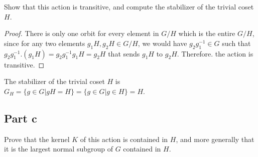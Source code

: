 \begin{question}
    Show that this action is transitive, and compute the stabilizer of the trivial coset $H$.
\end{question}

\begin{answer}
    \begin{proof}
        There is only one orbit for every element in $G/H$ which is the entire $G/H$, since for any two elements $g_1H, g_2H \in G/H$, we would have $g_2g_1^{-1} \in G$ such that $g_2g_1^{-1}.(g_1H) = g_2g_1^{-1}g_1H = g_2H$ that sends $g_1H$ to $g_2H$. Therefore. the action is transitive.
    \end{proof}
    The stabilizer of the trivial coset $H$ is $G_H = \{g \in G \lvert gH = H\} = \{g \in G \lvert g \in H\} = H$.
\end{answer}

\subsection{Part c}

\begin{question}
    Prove that the kernel $K$ of this action is contained in $H$, and more generally that it is the largest normal subgroup of $G$ contained in $H$.
\end{question}

